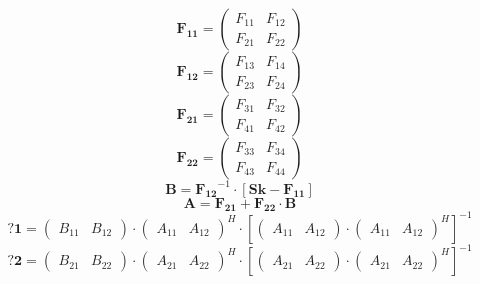\[ \mathbf{F_{11}} = \left(\begin{smallmatrix} F_{11} & F_{12} \\ F_{21} & F_{22} \end{smallmatrix}\right) \]
\[ \mathbf{F_{12}} = \left(\begin{smallmatrix} F_{13} & F_{14} \\ F_{23} & F_{24} \end{smallmatrix}\right) \]
\[ \mathbf{F_{21}} = \left(\begin{smallmatrix} F_{31} & F_{32} \\ F_{41} & F_{42} \end{smallmatrix}\right) \]
\[ \mathbf{F_{22}} = \left(\begin{smallmatrix} F_{33} & F_{34} \\ F_{43} & F_{44} \end{smallmatrix}\right) \]
\[ \mathbf{B}=\mathbf{F_{12}}^{-1}\cdot\left[\mathbf{Sk}-\mathbf{F_{11}}\right] \]
\[ \mathbf{A}=\mathbf{F_{21}}+\mathbf{F_{22}}\cdot\mathbf{B} \]
\[ \mathbf{?1}= \left(\begin{smallmatrix} B_{11} & B_{12} \end{smallmatrix}\right)\cdot \left(\begin{smallmatrix} A_{11} & A_{12} \end{smallmatrix}\right)^H\cdot\left[ \left(\begin{smallmatrix} A_{11} & A_{12} \end{smallmatrix}\right)\cdot\left(\begin{smallmatrix} A_{11} & A_{12} \end{smallmatrix}\right)^H\right]^{-1} \]
\[ \mathbf{?2}= \left(\begin{smallmatrix} B_{21} & B_{22} \end{smallmatrix}\right)\cdot \left(\begin{smallmatrix} A_{21} & A_{22} \end{smallmatrix}\right)^H\cdot\left[ \left(\begin{smallmatrix} A_{21} & A_{22} \end{smallmatrix}\right)\cdot\left(\begin{smallmatrix} A_{21} & A_{22} \end{smallmatrix}\right)^H\right]^{-1} \]
